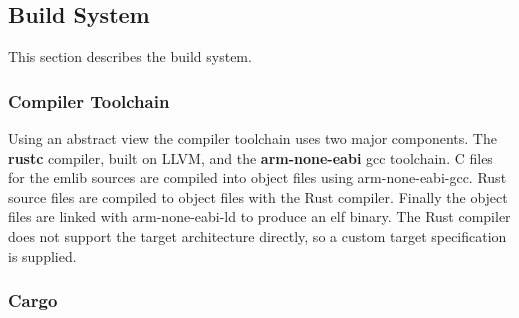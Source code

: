 \subsection{Build System}

This section describes the build system.

\subsubsection{Compiler Toolchain}

Using an abstract view the compiler toolchain uses two major components.
The \textbf{rustc} compiler, built on LLVM, and the \textbf{arm-none-eabi} gcc toolchain.
C files for the emlib sources are compiled into object files using arm-none-eabi-gcc.
Rust source files are compiled to object files with the Rust compiler.
Finally the object files are linked with arm-none-eabi-ld to produce an elf binary.
The Rust compiler does not support the target architecture directly, so a custom target specification is supplied.

\subsubsection{Cargo}


